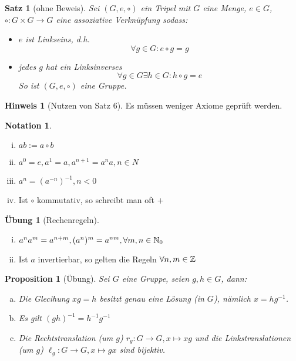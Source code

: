 \documentclass[a4paper]{report}
\theoremstyle{plain}
\newtheorem{prop}[thm]{Proposition}
\newtheorem{satz}[thm]{Satz}
\theoremstyle{definition}
\newtheorem*{hin*}{Hinweis}
\newtheorem*{nota*}{Notation}
\newtheorem*{ubng*}{Übung}
\begin{document}
\begin{satz}[ohne Beweis]%
  Sei $(G, e, \circ)$ ein Tripel  mit $G$ eine Menge, $e \in G$, $\circ : G \times G \to G$ eine assoziative Verknüpfung sodass:
  \begin{itemize}
    \item  $e$ ist Linkseins, d.h.
    $$\forall g \in G : e \circ g = g$$
    \item jedes $g$ hat ein Linksinverses $$\forall g \in G \exists h \in G : h \circ g = e$$
    So ist $(G, e, \circ)$ eine Gruppe.
  \end{itemize}
\end{satz}
\begin{hin*}[Nutzen von Satz 6]
  Es müssen weniger Axiome geprüft werden.
\end{hin*}
\begin{nota*}
  \item
  \begin{enumerate}[(i)]
\item $ab := a \circ b$
\item $a^{0} = e, a^{1}=a, a^{n+1}=a^{n}a, n \in N$
    \item $a^{n} = (a^{-n})^{-1}, n < 0$

\item  Ist $\circ$ kommutativ, so schreibt man oft $+$
  \end{enumerate}
\end{nota*}
\begin{ubng*}[Rechenregeln]
  \item
  \begin{enumerate}[(i)]
\item  $a^{n}a^{m}=a^{n+m}, (a^{n})^{m}=a^{nm}, \forall m,n \in \Bbb N_{0}$
\item  Ist $a$ invertierbar, so gelten die Regeln $\forall n,m \in \Bbb Z$
  \end{enumerate}
\end{ubng*}

\begin{prop}[Übung]
  Sei $G$ eine Gruppe, seien $g,h \in G$, dann:
  \begin{enumerate}[(a)]
    \item Die Glecihung $xg = h$ besitzt genau eine Lösung (in $G$), nämlich $x=hg^{-1}$.
    \item Es gilt $(gh)^{-1} = h^{-1}g^{-1}$
    \item Die Rechtstranslation (um $g$) $r_{g}: G \to G, x \mapsto xg$ und die Linkstranslationen (um $g$) $\ell_{g}: G \to G, x \mapsto gx$
    sind bijektiv.

  \end{enumerate}
\end{prop}
\end{document}
